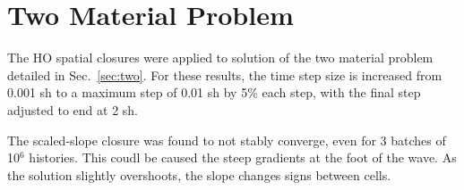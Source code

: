 \section{Two Material Problem}

The HO spatial closures were applied to solution of the two material problem detailed in Sec.~\ref{sec:two}.
For these results, the time step size is increased from 0.001 sh to a maximum step of 0.01 sh by 5\% each
step, with the final step adjusted to end at 2 sh.

The scaled-slope closure was found to not stably converge, even for 3 batches of 10$^6$
histories.  This coudl be caused the steep gradients at the foot of the wave.  As the
solution slightly overshoots, the slope changes signs between cells. 

